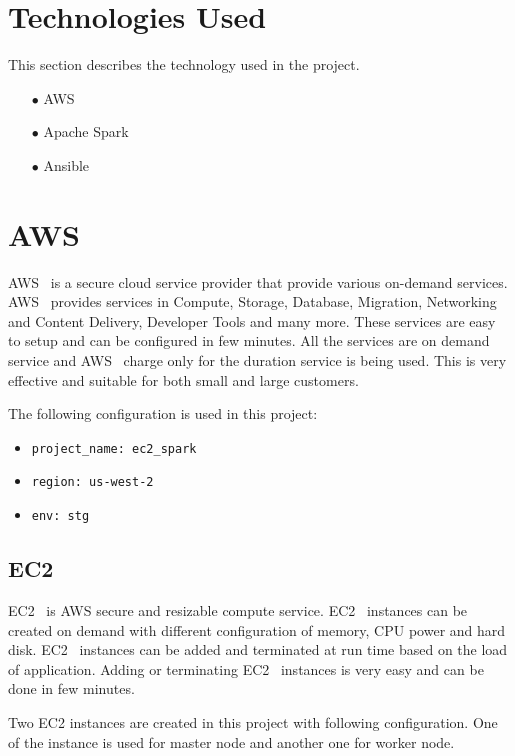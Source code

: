 \section{Technologies Used}
This section describes the technology used in the project.

\begin{itemize}
	\item[$\bullet$] AWS 
	\item[$\bullet$] Apache Spark 
	\item[$\bullet$] Ansible
\end{itemize}

\section{AWS}

AWS~\cite{hid-sp18-511-www-aws} is a secure cloud service provider
that provide various on-demand services.
AWS~\cite{hid-sp18-511-www-aws} provides services in Compute, Storage,
Database, Migration, Networking and Content Delivery, Developer Tools
and many more. These services are easy to setup and can be configured in few
minutes. All the services are on demand service and
AWS~\cite{hid-sp18-511-www-aws} charge only for the duration service is
being used. This is very effective and suitable for both small and
large customers.

The following configuration is used in this project:

\begin{itemize}
	\item \verb|project_name: ec2_spark|
	\item \verb|region: us-west-2|
	\item \verb|env: stg|
\end{itemize}


\subsection{EC2}

EC2~\cite{hid-sp18-511-www-ec2} is AWS secure and resizable compute
service. EC2~\cite{hid-sp18-511-www-ec2} instances can be created on
demand with different configuration of memory, CPU power and hard
disk. EC2~\cite{hid-sp18-511-www-ec2} instances can be added and
terminated at run time based on the load of application. Adding or
terminating EC2~\cite{hid-sp18-511-www-ec2} instances is very easy and can
be done in few minutes.

Two EC2 instances are created in this project with following
configuration. One of the instance is used for master node and another one
for worker node.

